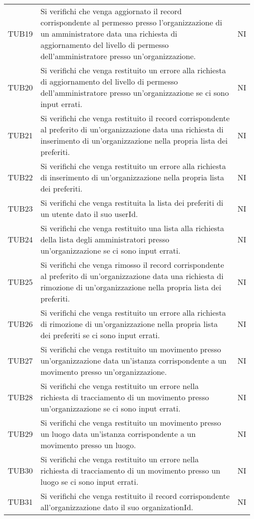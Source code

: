 {\begin{longtable}{ c C{13cm} C{1cm}}
TUB19 & Si verifichi che venga aggiornato il record corrispondente al permesso presso l'organizzazione di un amministratore data una richiesta di aggiornamento del livello di permesso dell'amministratore presso un'organizzazione. & NI \\
TUB20 & Si verifichi che venga restituito un errore alla richiesta di aggiornamento del livello di permesso dell'amministratore presso un'organizzazione se ci sono input errati. & NI \\
TUB21 & Si verifichi che venga restituito il record corrispondente al preferito di un'organizzazione data una richiesta di inserimento di un'organizzazione nella propria lista dei preferiti. & NI \\
TUB22 & Si verifichi che venga restituito un errore alla richiesta di inserimento di un'organizzazione nella propria lista dei preferiti. & NI \\
TUB23 & Si verifichi che venga restituita la lista dei preferiti di un utente dato il suo userId. & NI \\
TUB24 & Si verifichi che venga restituito una lista alla richiesta della lista degli amministratori presso un'organizzazione se ci sono input errati. & NI \\
TUB25 & Si verifichi che venga rimosso il record corrispondente al preferito di un'organizzazione data una richiesta di rimozione di un'organizzazione nella propria lista dei preferiti. & NI \\
TUB26 & Si verifichi che venga restituito un errore alla richiesta di rimozione di un'organizzazione nella propria lista dei preferiti se ci sono input errati. & NI \\
TUB27 & Si verifichi che venga restituito un movimento presso un'organizzazione data un'istanza corrispondente a un movimento presso un'organizzazione. & NI \\
TUB28 & Si verifichi che venga restituito un errore nella richiesta di tracciamento di un movimento presso un'organizzazione se ci sono input errati. & NI \\
TUB29 & Si verifichi che venga restituito un movimento presso un luogo data un'istanza corrispondente a un movimento presso un luogo. & NI \\
TUB30 & Si verifichi che venga restituito un errore nella richiesta di tracciamento di un movimento presso un luogo se ci sono input errati. & NI \\
TUB31 & Si verifichi che venga restituito il record corrispondente all'organizzazione dato il suo organizationId. & NI \\

\end{longtable}}
